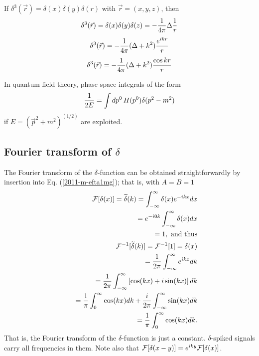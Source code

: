 If $ \delta^{3} ({\vec r})=
\delta (x)
\delta (y)
\delta (r)$ with ${\vec r}=(x,y,z)$, then
 \begin{equation}
 \delta^{3} ({\vec r})=\delta (x)\delta (y)\delta (z)=-{1\over 4\pi }\Delta {1\over  r }
 \end{equation}
 \begin{equation}
 \delta^{3}  ({\vec r})=-{1\over 4\pi }(\Delta +k^2){e^{ikr}\over r}
 \end{equation}
 \begin{equation}
 \delta^{3}  ({\vec r})=-{1\over 4\pi }(\Delta +k^2){\cos kr\over r}
 \end{equation}

In quantum field theory,  phase space integrals of the form
 \begin{equation}
 {1\over 2E}=\int dp^0 \, H (p^0)\delta (p^2-m^2)
 \end{equation}
 if $E=({\vec p}^2+m^2)^{(1/2)}$
 are exploited.




\subsection{Fourier transform  of $\delta$}
The Fourier transform of the $\delta$-function can be obtained straightforwardly
by insertion into Eq. (\ref{2011-m-efta1mg}); that is,
with $A=B=1$
\begin{equation}
\begin{split}
  {\cal F}[\delta (x)]=\widetilde{\delta}(k)=   \int_{-\infty}^\infty  \delta(x) e^{-i{kx}} dx   \\
\qquad =    e^{-i{0k}}  \int_{-\infty}^\infty  \delta(x)  dx   \\
\qquad =    1, \textrm{ and thus}
\\
 {\cal F}^{-1}[\widetilde{\delta} (k)]=
 {\cal F}^{-1}[1]=\delta (x)  \\
\qquad = \frac{1}{2\pi}  \int_{-\infty}^\infty    e^{i{kx}} dk\\
\qquad =
\frac{1}{2\pi}  \int_{-\infty}^\infty  \left[  \cos(kx)+ i \sin(kx) \right] dk\\
\qquad =
\frac{1}{ \pi}  \int_{0}^\infty    \cos(kx) dk   +
\frac{ i }{2\pi}  \int_{-\infty}^\infty   \sin(kx)   dk\\
\qquad =
\frac{1}{ \pi}  \int_{0}^\infty    \cos(kx) dk
.
\end{split}
\label{2011-m-eftdelta}
\end{equation}
That is, the Fourier transform of the $\delta$-function is just a constant.
$\delta$-spiked signals carry all frequencies in them.
Note also that  ${\cal F}[\delta (x-y)]=e^{i{ky}}{\cal F}[\delta (x)]$.

